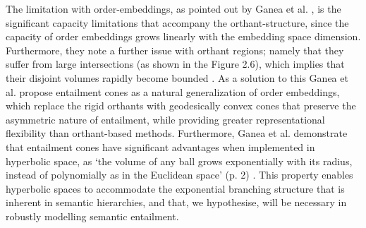 \documentclass[12pt,twoside]{report}
\begin{document}
The limitation with order-embeddings, as pointed out by Ganea et al. \cite{ganea2018hyperbolicentailmentconeslearning}, is the significant capacity limitations that accompany the orthant-structure, since the capacity of order embeddings grows linearly with the embedding space dimension. Furthermore, they note a further issue with orthant regions; namely that they suffer from large intersections (as shown in the Figure 2.6), which implies that their disjoint volumes rapidly become bounded \cite{ganea2018hyperbolicentailmentconeslearning}. As a solution to this Ganea et al. propose entailment cones as a natural generalization of order embeddings, which replace the rigid orthants with geodesically convex cones that preserve the asymmetric nature of entailment, while providing greater representational flexibility than orthant-based methods. \cite{ganea2018hyperbolicentailmentconeslearning} Furthermore, Ganea et al. demonstrate that entailment cones have significant advantages when implemented in hyperbolic space, as `the volume of any ball grows exponentially with its radius, instead of polynomially as in the Euclidean space' (p. 2) \cite{ganea2018hyperbolicentailmentconeslearning}. This property enables hyperbolic spaces to accommodate the exponential branching structure that is inherent in semantic hierarchies, and that, we hypothesise, will be necessary in robustly modelling semantic entailment. 


\end{document}
